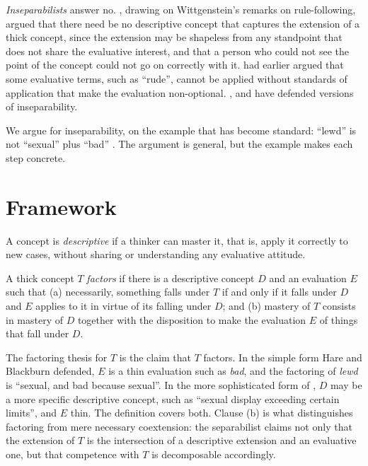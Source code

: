 \documentclass{situationist-preprint}
\begin{document}
\emph{Inseparabilists} answer no. \citet{McDowell1981}, drawing on Wittgenstein's remarks on rule-following, argued that there need be no descriptive concept that captures the extension of a thick concept, since the extension may be shapeless from any standpoint that does not share the evaluative interest, and that a person who could not see the point of the concept could not go on correctly with it. \citet{Foot1958} had earlier argued that some evaluative terms, such as \enquote{rude}, cannot be applied without standards of application that make the evaluation non-optional. \citet{Dancy1995}, \citet{Putnam2002} and \citet{Roberts2013} have defended versions of inseparability.

We argue for inseparability, on the example that has become standard: \enquote{lewd} is not \enquote{sexual} plus \enquote{bad} \citep{Blackburn1992,Vayrynen2013}. The argument is general, but the example makes each step concrete.

\section{Framework}

\begin{definition}\label{d:desc}
A concept is \emph{descriptive} if a thinker can master it, that is, apply it correctly to new cases, without sharing or understanding any evaluative attitude.
\end{definition}

\begin{definition}[Factoring]\label{d:factor}
A thick concept $T$ \emph{factors} if there is a descriptive concept $D$ and an evaluation $E$ such that (a) necessarily, something falls under $T$ if and only if it falls under $D$ and $E$ applies to it in virtue of its falling under $D$; and (b) mastery of $T$ consists in mastery of $D$ together with the disposition to make the evaluation $E$ of things that fall under $D$.
\end{definition}

The factoring thesis for $T$ is the claim that $T$ factors. In the simple form Hare and Blackburn defended, $E$ is a thin evaluation such as \emph{bad}, and the factoring of \emph{lewd} is \enquote{sexual, and bad because sexual}. In the more sophisticated form of \citet{ElsteinHurka2009}, $D$ may be a more specific descriptive concept, such as \enquote{sexual display exceeding certain limits}, and $E$ thin. The definition covers both. Clause (b) is what distinguishes factoring from mere necessary coextension: the separabilist claims not only that the extension of $T$ is the intersection of a descriptive extension and an evaluative one, but that competence with $T$ is decomposable accordingly.
\end{document}
